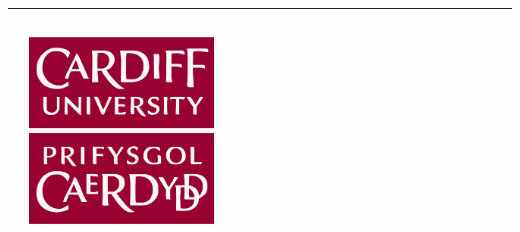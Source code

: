 \documentclass[usenames,dvipsnames,t]{beamer}
\begin{document}
\hrule height 5pt 
\begin{columns}
    \begin{column}{.1\linewidth}
    \end{column}
    \begin{column}{.2\linewidth}
        \vspace{0.7cm}

        \includegraphics[width=0.4\textwidth]{static/cardiff_uni_logo.jpg}
    \end{column}
    \begin{column}{.2\linewidth}
        \vspace{0.7cm}

        \faTwitter \ NikoletaGlyn \\
        \faGithub \ Nikoleta-v3}
    \end{column}
    \begin{column}{.7\linewidth}

        
        
    \end{column}
\end{columns}
\end{document}
